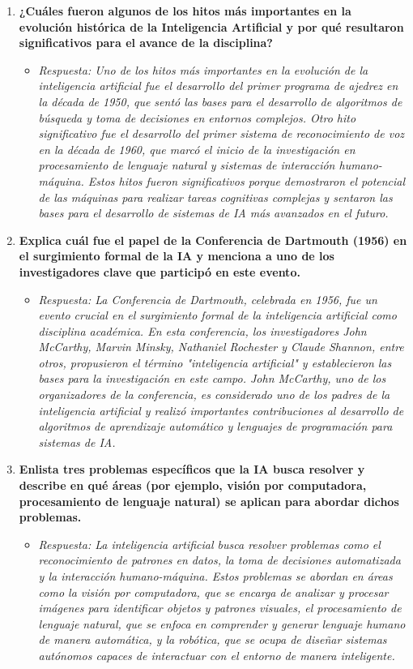 \documentclass[12pt]{article}
\begin{document}
\begin{enumerate}
    \item \textbf{¿Cuáles fueron algunos de los hitos más importantes en la evolución histórica de la Inteligencia Artificial y por qué resultaron significativos para el avance de la disciplina?}
    \begin{itemize}
        \item \textit{Respuesta: Uno de los hitos más importantes en la evolución de la inteligencia artificial fue el desarrollo del primer programa de ajedrez en la década de 1950, que sentó las bases para el desarrollo de algoritmos de búsqueda y toma de decisiones en entornos complejos. Otro hito significativo fue el desarrollo del primer sistema de reconocimiento de voz en la década de 1960, que marcó el inicio de la investigación en procesamiento de lenguaje natural y sistemas de interacción humano-máquina. Estos hitos fueron significativos porque demostraron el potencial de las máquinas para realizar tareas cognitivas complejas y sentaron las bases para el desarrollo de sistemas de IA más avanzados en el futuro.} 
    \end{itemize}

    \item \textbf{Explica cuál fue el papel de la Conferencia de Dartmouth (1956) en el surgimiento formal de la IA y menciona a uno de los investigadores clave que participó en este evento.}
    \begin{itemize}
        \item \textit{Respuesta: La Conferencia de Dartmouth, celebrada en 1956, fue un evento crucial en el surgimiento formal de la inteligencia artificial como disciplina académica. En esta conferencia, los investigadores John McCarthy, Marvin Minsky, Nathaniel Rochester y Claude Shannon, entre otros, propusieron el término "inteligencia artificial" y establecieron las bases para la investigación en este campo. John McCarthy, uno de los organizadores de la conferencia, es considerado uno de los padres de la inteligencia artificial y realizó importantes contribuciones al desarrollo de algoritmos de aprendizaje automático y lenguajes de programación para sistemas de IA.} 
    \end{itemize}

    \item \textbf{Enlista tres problemas específicos que la IA busca resolver y describe en qué áreas (por ejemplo, visión por computadora, procesamiento de lenguaje natural) se aplican para abordar dichos problemas.}
    \begin{itemize}
        \item \textit{Respuesta: La inteligencia artificial busca resolver problemas como el reconocimiento de patrones en datos, la toma de decisiones automatizada y la interacción humano-máquina. Estos problemas se abordan en áreas como la visión por computadora, que se encarga de analizar y procesar imágenes para identificar objetos y patrones visuales, el procesamiento de lenguaje natural, que se enfoca en comprender y generar lenguaje humano de manera automática, y la robótica, que se ocupa de diseñar sistemas autónomos capaces de interactuar con el entorno de manera inteligente.} 
    \end{itemize}


\end{enumerate}
\end{document}

